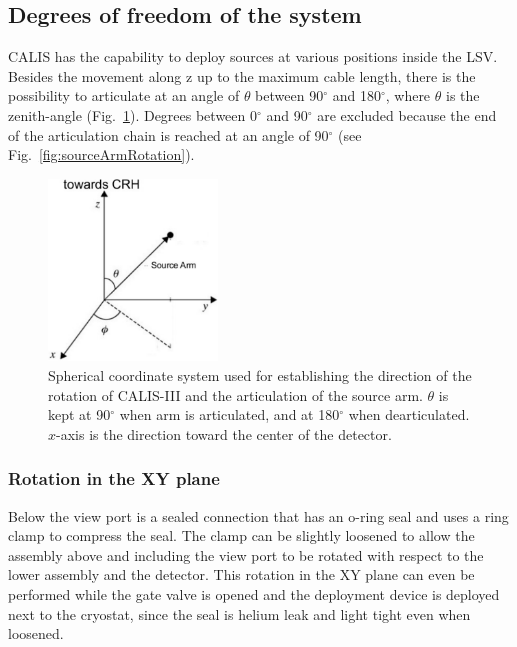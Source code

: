 \subsection{Degrees of freedom of the system}

CALIS has the capability to deploy sources at various positions inside the LSV. Besides the movement along z up to the maximum cable length, there is the possibility to articulate at an angle of $\theta$ between 90$^{\circ}$ and 180$^{\circ}$, where $\theta$ is the zenith-angle (Fig.~\ref{fig:coordinate_system}). Degrees between 0$^{\circ}$ and 90$^{\circ}$ are excluded because the end of the articulation chain is reached at an angle of 90$^{\circ}$ (see Fig.~\ref{fig:sourceArmRotation}).

\begin{figure}[htbp]
 \centering
  \includegraphics[width=0.4\textwidth]{Figures/coordinate_system}
  \caption{Spherical coordinate system used for establishing the direction of the rotation of CALIS-III and the articulation of the source arm. $\theta$ is kept at 90$^{\circ}$ when arm is articulated, and at 180$^{\circ}$ when dearticulated. $x$-axis is the direction toward the center of the detector. }
  \label{fig:coordinate_system}
\end{figure} 

\subsubsection{Rotation in the XY plane}\label{sec:XYrotation}
Below the view port is a sealed connection that has an o-ring seal and uses a ring clamp to compress the seal. The clamp can be slightly loosened to allow the assembly above and including the view port to be rotated with respect to the lower assembly and the detector. This rotation in the XY plane can even be performed while the gate valve is opened and the deployment device is deployed next to the cryostat, since the seal is helium leak and light tight even when loosened.

